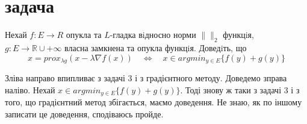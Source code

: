 \section{задача}

\begin{tcolorbox}[title=Умова]
    Нехай $f : E \rightarrow R $ опукла та $L$-гладка вiдносно норми 
    $\|  \|_2$ функцiя, $g : E \rightarrow \mathbb{R} \cup {+\infty} $ 
    власна замкнена та опукла функцiя. Доведiть, що
    $$ x = prox_{\lambda g}(x - \lambda \nabla f(x)) \quad 
    \Leftrightarrow \quad x \in argmin_{y \in E} \{f(y) + g(y)\} $$
\end{tcolorbox}


Зліва направо впипливає з задачі 3 і з градієнтного методу. 
Доведемо зправа наліво. Нехай $x \in argmin_{y \in E} \{f(y) + g(y)\}$. 
Тоді знову ж таки з задачі 3 і з того, що градієнтний метод збігається, маємо доведення.
Не знаю, як по іншому записати це доведення, сподіваюсь пройде.